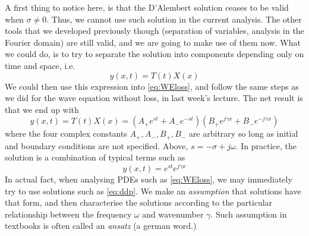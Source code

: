 A first thing to notice here, is that the D'Alembert solution ceases to be valid when $\sigma  \neq 0$. Thus, we cannot use such solution in the current analysis. The other tools that we developed previously though (separation of variables, analysis in the Fourier domain) are still valid, and we are going to make use of them now. What we could do, is to try to separate the solution into components depending only on time and space, i.e.
\begin{equation}
y(x,t) = T(t)X(x)
\end{equation}
We could then use this expression into \eqref{eq:WEloss}, and follow the same steps as we did for the wave equation without loss, in last week's lecture. The net result is that we end up with
\begin{equation}
y(x,t) = T(t)X(x) = \left(A_+ e^{st} + A_- e^{-st} \right)\left(B_+ e^{j\gamma x} + B_- e^{-j \gamma x} \right)
\end{equation}
where the four complex constants $A_+,A_-,B_+,B_-$ are arbitrary so long as initial and boundary conditions are not specified. Above, $s = -\sigma + j \omega$. In practice, the solution is a combination of typical terms such as
\begin{equation}\label{eq:ddp}
y(x,t) = e^{st}e^{j\gamma x} 
\end{equation}
In actual fact, when analysing PDEs such as \eqref{eq:WEloss}, we may immediately try to use solutions such as \eqref{eq:ddp}. We make an \emph{assumption} that solutions have that form, and then characterise the solutions according to the particular relationship between the frequency $\omega$ and wavenumber $\gamma$. Such assumption in textbooks is often called an \emph{ansatz} (a german word.)

